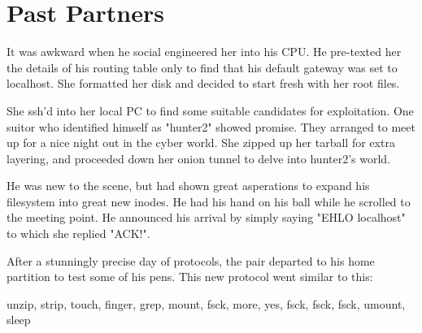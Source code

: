 \chapter{Past Partners}

It was awkward when he social engineered her into his CPU. He
pre-texted her the details of his routing table only to find that his
default gateway was set to localhost. She formatted her disk and
decided to start fresh with her root files.

She ssh'd into her local PC to find some suitable candidates for
exploitation. One suitor who identified himself as "hunter2" showed
promise. They arranged to meet up for a nice night out in the cyber
world. She zipped up her tarball for extra layering, and proceeded
down her onion tunnel to delve into hunter2's world.

He was new to the scene, but had shown great asperations to expand
his filesystem into great new inodes. He had his hand on his ball
while he scrolled to the meeting point. He announced his arrival by
simply saying "EHLO localhost" to which she replied "ACK!".

After a stunningly precise day of protocols, the pair departed to
his home partition to test some of his pens. This new protocol went
similar to this:

  unzip, strip, touch, finger, grep, mount, fsck, more, yes, fsck, fsck, fsck, umount, sleep
